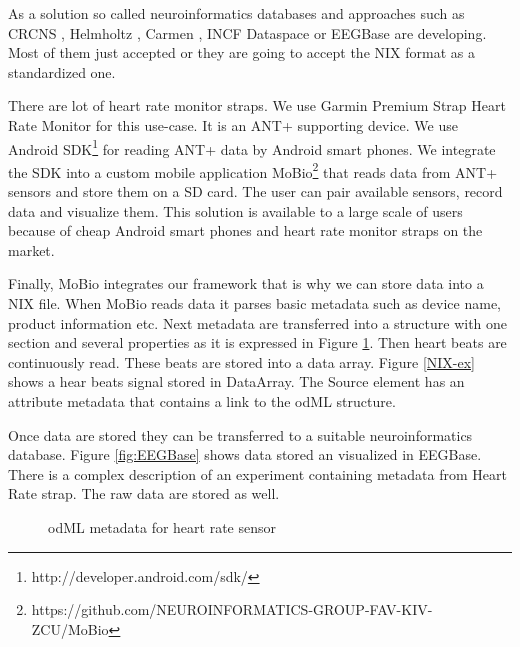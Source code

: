 \documentclass[conference]{IEEEtran}
\begin{document}
As a solution so called neuroinformatics databases and approaches such as CRCNS \cite{CRCNS}, Helmholtz \cite{10.3389/conf.fninf.2013.09.00025}, Carmen \cite{fgibson:Watson2007}, INCF Dataspace \cite{dataspace} or EEGBase \cite{ISI:000306821100004} are developing. Most of them just accepted or they are going to accept the NIX format as a standardized one.

There are lot of heart rate monitor straps. We use Garmin Premium Strap Heart Rate Monitor for this use-case. It is an ANT+ supporting device. We use Android SDK\footnote{http://developer.android.com/sdk/} for reading ANT+ data by Android smart phones. We integrate the SDK into a custom mobile application MoBio\footnote{https://github.com/NEUROINFORMATICS-GROUP-FAV-KIV-ZCU/MoBio} that reads data from ANT+ sensors and store them on a SD card. The user can pair available sensors, record data and visualize them. This solution is available to a large scale of users because of cheap Android smart phones and heart rate monitor straps on the market.

Finally, MoBio integrates our framework that is why we can store data into a NIX file. When MoBio reads data it parses basic metadata such as device name, product information etc. Next metadata are transferred into a structure with one section and several properties as it is expressed in Figure \ref{odML}. Then heart beats are continuously read. These beats are stored into a data array. Figure \ref{NIX-ex} shows a hear beats signal stored in DataArray. The Source element has an attribute metadata that contains a link to the odML structure.

Once data are stored they can be transferred to a suitable neuroinformatics database. Figure \ref{fig:EEGBase} shows data stored an visualized in EEGBase. There is a complex description of an experiment containing metadata from Heart Rate strap. The raw data are stored as well.

\begin{figure}

\caption{\label{odML}odML metadata for heart rate sensor}
\end{figure}
\end{document}
